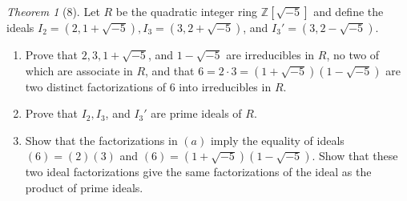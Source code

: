\documentclass[12pt]{article}
\theoremstyle{remark}
\theoremstyle{named}
\newtheorem*{theorem}{Theorem}
\newcommand{\Z}{\mathbb Z}
\begin{document}
\begin{theorem}[8]
    Let \(R\) be the quadratic integer ring \(\Z[\sqrt{-5}]\) and define the ideals \(I_2 = (2, 1 + \sqrt{-5}), I_3 = (3, 2 + \sqrt{-5})\), and \(I_3' = (3, 2 - \sqrt{-5})\). 
    \begin{enumerate}
        \item Prove that \(2, 3, 1 + \sqrt{-5}\), and \(1 - \sqrt{-5}\) are irreducibles in \(R\), no two of which are associate in \(R\), and that \(6 = 2 \cdot 3 = (1 + \sqrt{-5})(1 - \sqrt{-5})\) are two distinct factorizations of \(6\) into irreducibles in \(R\). 
        \item Prove that \(I_2, I_3\), and \(I_3'\) are prime ideals of \(R\). 
        \item Show that the factorizations in \((a)\) imply the equality of ideals \((6) = (2)(3)\) and \((6) = (1 + \sqrt{-5})(1 - \sqrt{-5})\). Show that these two ideal factorizations give the same factorizations of the ideal as the product of prime ideals.
    \end{enumerate}
\end{theorem}
\end{document}
